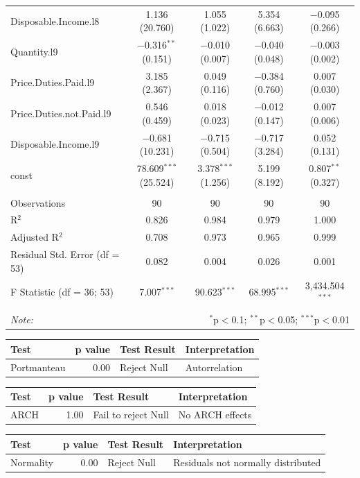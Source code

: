 \documentclass[11pt,preprint, authoryear]{elsarticle}
\let\origtable\table
\let\endorigtable\endtable
\renewenvironment{table}[1][2] {
    \expandafter\origtable\expandafter[H]
} {
    \endorigtable
}
\numberwithin{equation}{section}
\numberwithin{figure}{section}
\numberwithin{table}{section}
\begin{document}
\begin{table}[!htbp]
\begin{tabular}{@{\extracolsep{1pt}}lcccc}
  Disposable.Income.l8 & 1.136 (20.760) & 1.055 (1.022) & 5.354 (6.663) & $-$0.095 (0.266) \\ 
  Quantity.l9 & $-$0.316$^{**}$ (0.151) & $-$0.010 (0.007) & $-$0.040 (0.048) & $-$0.003 (0.002) \\ 
  Price.Duties.Paid.l9 & 3.185 (2.367) & 0.049 (0.116) & $-$0.384 (0.760) & 0.007 (0.030) \\ 
  Price.Duties.not.Paid.l9 & 0.546 (0.459) & 0.018 (0.023) & $-$0.012 (0.147) & 0.007 (0.006) \\ 
  Disposable.Income.l9 & $-$0.681 (10.231) & $-$0.715 (0.504) & $-$0.717 (3.284) & 0.052 (0.131) \\ 
  const & 78.609$^{***}$ (25.524) & 3.378$^{***}$ (1.256) & 5.199 (8.192) & 0.807$^{**}$ (0.327) \\ 
 \hline \\[-1.8ex] 
Observations & 90 & 90 & 90 & 90 \\ 
R$^{2}$ & 0.826 & 0.984 & 0.979 & 1.000 \\ 
Adjusted R$^{2}$ & 0.708 & 0.973 & 0.965 & 0.999 \\ 
Residual Std. Error (df = 53) & 0.082 & 0.004 & 0.026 & 0.001 \\ 
F Statistic (df = 36; 53) & 7.007$^{***}$ & 90.623$^{***}$ & 68.995$^{***}$ & 3,434.504$^{***}$ \\ 
\hline 
\hline \\[-1.8ex] 
\textit{Note:}  & \multicolumn{4}{r}{$^{*}$p$<$0.1; $^{**}$p$<$0.05; $^{***}$p$<$0.01} \\ 
\end{tabular} 
\end{table}

\begin{table}[H]
\centering
\begin{tabular}{lrll}
  \hline
Test & p value & Test Result & Interpretation \\ 
  \hline
Portmanteau & 0.00 & Reject Null & Autorrelation \\ 
   \hline
\end{tabular}
\caption{Serial Correlcation Test \label{diag}} 
\end{table}
\begin{table}[H]
\centering
\begin{tabular}{lrll}
  \hline
Test & p value & Test Result & Interpretation \\ 
  \hline
ARCH & 1.00 & Fail to reject Null & No ARCH effects \\ 
   \hline
\end{tabular}
\caption{ARCH Tests \label{archh}} 
\end{table}
\begin{table}[H]
\centering
\begin{tabular}{lrll}
  \hline
Test & p value & Test Result & Interpretation \\ 
  \hline
Normality & 0.00 & Reject Null & Residuals not normally distributed \\ 
   \hline
\end{tabular}
\caption{ARCH Tests \label{archh}} 
\end{table}
\end{document}
